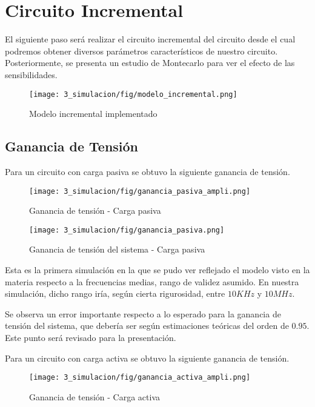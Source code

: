 \section{Circuito Incremental}
El siguiente paso será realizar el circuito incremental del circuito desde el cual podremos obtener diversos parámetros 
característicos de nuestro circuito. Posteriormente, se presenta un estudio de Montecarlo para ver el efecto de 
las sensibilidades.

\begin{figure}[H]
    \centering
    \texttt{[image: 3\_simulacion/fig/modelo\_incremental.png]}
    \label{mediciones_pol_activa}
    \caption{Modelo incremental implementado}
\end{figure}

\subsection{Ganancia de Tensión}

Para un circuito con carga pasiva se obtuvo la siguiente ganancia de tensión.

\begin{figure}[H]
    \centering
    \texttt{[image: 3\_simulacion/fig/ganancia\_pasiva\_ampli.png]}
    \label{mediciones_pol_activa}
    \caption{Ganancia de tensión -  Carga pasiva}
\end{figure}

\begin{figure}[H]
    \centering
    \texttt{[image: 3\_simulacion/fig/ganancia\_pasiva.png]}
    \label{mediciones_pol_activa}
    \caption{Ganancia de tensión del sistema -  Carga pasiva}
\end{figure}

Esta es la primera simulación en la que se pudo ver reflejado el modelo visto en 
la materia respecto a la frecuencias medias, rango de validez asumido. En nuestra simulación,
dicho rango iría, según cierta rigurosidad, entre $10 KHz$ y $10 MHz$.

Se observa un error importante respecto a lo esperado para la ganancia de tensión del sistema, que debería ser según
estimaciones teóricas del orden de $0.95$. Este punto será revisado para la presentación.

Para un circuito con carga activa se obtuvo la siguiente ganancia de tensión.

\begin{figure}[H]
    \centering
    \texttt{[image: 3\_simulacion/fig/ganancia\_activa\_ampli.png]}
    \label{mediciones_pol_activa}
    \caption{Ganancia de tensión -  Carga activa}
\end{figure}

